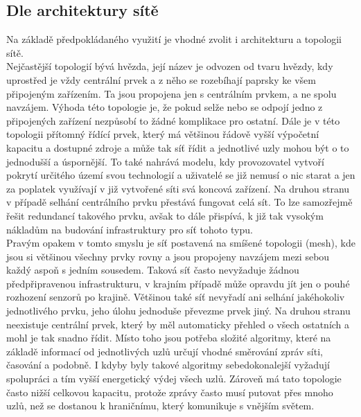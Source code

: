 \documentclass{ctuthesis}
\begin{document}
\subsection{Dle architektury sítě}
Na základě předpokládaného využití je vhodné zvolit i architekturu a topologii sítě.\\
Nejčastější topologií bývá hvězda, její název je odvozen od tvaru hvězdy, kdy uprostřed je vždy centrální prvek a z něho se rozebíhají paprsky ke všem připojeným zařízením. Ta jsou propojena jen s centrálním prvkem, a ne spolu navzájem.  Výhoda této topologie je, že pokud selže nebo se odpojí jedno z připojených zařízení nezpůsobí to žádné komplikace pro ostatní.  Dále je v této topologii přítomný řídící prvek, který má většinou řádově vyšší výpočetní kapacitu a dostupné zdroje a může tak síť řídit a jednotlivé uzly mohou být o to jednodušší a úspornější. To také nahrává modelu, kdy provozovatel vytvoří pokrytí určitého území svou technologií a uživatelé se již nemusí o nic starat a jen za poplatek využívají v již vytvořené síti svá koncová zařízení. Na druhou stranu v případě selhání centrálního prvku přestává fungovat celá sít. To lze samozřejmě řešit redundancí takového prvku, avšak to dále přispívá, k již tak vysokým nákladům na budování infrastruktury pro síť tohoto typu.\\
Pravým opakem v tomto smyslu je síť postavená na smíšené topologii (mesh), kde jsou si většinou všechny prvky rovny a jsou propojeny navzájem mezi sebou každý aspoň s jedním sousedem.  Taková síť často nevyžaduje žádnou předpřipravenou infrastrukturu, v krajním případě může opravdu jít jen o pouhé rozhození senzorů po krajině. Většinou také síť nevyřadí ani selhání jakéhokoliv jednotlivého prvku, jeho úlohu jednoduše převezme prvek jiný. Na druhou stranu neexistuje centrální prvek, který by měl automaticky přehled o všech ostatních a mohl je tak snadno řídit. Místo toho jsou potřeba složité algoritmy, které na základě informací od jednotlivých uzlů určují vhodné směrování zpráv síti, časování a podobně. I kdyby byly takové algoritmy sebedokonalejší vyžadují spolupráci a tím vyšší energetický výdej všech uzlů. Zároveň má tato topologie často nižší celkovou kapacitu, protože zprávy často musí putovat   přes mnoho uzlů, než se dostanou k hraničnímu, který komunikuje s vnějším světem.
\end{document}
